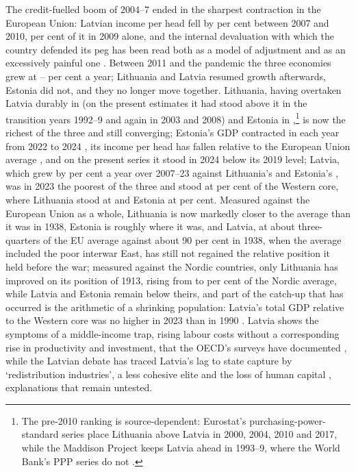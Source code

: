 The credit-fuelled boom of 2004--7 ended in the sharpest contraction in the European Union: Latvian income per head fell by \lvFALLcrisis{} per cent between 2007 and 2010,  per cent of it in 2009 alone, and the internal devaluation with which the country defended its peg has been read both as a model of adjustment and as an excessively painful one \parencites[1]{aslund_2011_how}[326, 350]{blanchard_2013_boom}[6--7]{krasnopjorovs_2013_factors}. Between 2011 and the pandemic the three economies grew at -- per cent a year; Lithuania and Latvia resumed growth afterwards, Estonia did not, and they no longer move together. Lithuania, having overtaken Latvia durably in \ltOVERTAKElv{} (on the present estimates it had stood above it in the transition years 1992--9 and again in 2003 and 2008) and Estonia in \ltOVERTAKEee{},\footnote{The pre-2010 ranking is source-dependent: Eurostat's purchasing-power-standard series place Lithuania above Latvia in 2000, 2004, 2010 and 2017, while the Maddison Project keeps Latvia ahead in 1993--9, where the World Bank's PPP series do not \parencites[98]{starkeviciute_2013_augimas}[39]{puur_2019_turbulent}[73--4]{norkusdvides}.} is now the richest of the three and still converging; Estonia's GDP contracted in each year from 2022 to 2024 \parencite[12]{povilauskas_2025_lietuvos}, its income per head has fallen relative to the European Union average \parencite[159]{tsaurkubule_2024_socio}, and on the present series it stood in 2024 below its 2019 level; Latvia, which grew by  per cent a year over 2007--23 against Lithuania's  and Estonia's , was in 2023 the poorest of the three and stood at  per cent of the Western core, where Lithuania stood at  and Estonia at  per cent. Measured against the European Union as a whole, Lithuania is now markedly closer to the average than it was in 1938, Estonia is roughly where it was, and Latvia, at about three-quarters of the EU average against about 90 per cent in 1938, when the average included the poor interwar East, has still not regained the relative position it held before the war; measured against the Nordic countries, only Lithuania has improved on its position of 1913, rising from  to  per cent of the Nordic average, while Latvia and Estonia remain below theirs, and part of the catch-up that has occurred is the arithmetic of a shrinking population: Latvia's total GDP relative to the Western core was no higher in 2023 than in 1990 \parencite[205]{klimantas2025thesis}. Latvia shows the symptoms of a middle-income trap, rising labour costs without a corresponding rise in productivity and investment, that the OECD's surveys have documented \parencites[70]{oecd_2022_boosting}[17, 23]{oecd_2024_key}, while the Latvian debate has traced Latvia's lag to state capture by `redistribution industries', a less cohesive elite and the loss of human capital \parencite[48--50]{krastins_2023_why}, explanations that remain untested.

